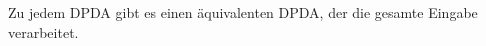\begin{lemma}[name={[\acs*{DPDA}, der gesamte Eingabe verarbeitet]}]
	\label{lem:DPDA ges. Eingabe}
	Zu jedem \ac{DPDA} gibt es einen äquivalenten \ac{DPDA}, der die gesamte Eingabe verarbeitet.
\end{lemma}


